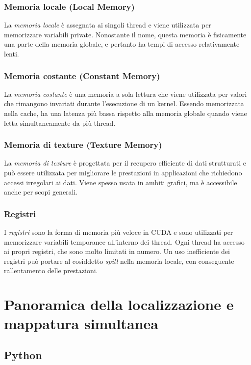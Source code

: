 \documentclass[12pt,a4paper]{report}
\begin{document}
\subsection{Memoria locale (Local Memory)}
La \textit{memoria locale} è assegnata ai singoli thread e viene utilizzata per memorizzare variabili private. Nonostante il nome, questa memoria è fisicamente una parte della memoria globale, e pertanto ha tempi di accesso relativamente lenti.

\subsection{Memoria costante (Constant Memory)}
La \textit{memoria costante} è una memoria a sola lettura che viene utilizzata per valori che rimangono invariati durante l'esecuzione di un kernel. Essendo memorizzata nella cache, ha una latenza più bassa rispetto alla memoria globale quando viene letta simultaneamente da più thread.

\subsection{Memoria di texture (Texture Memory)}
La \textit{memoria di texture} è progettata per il recupero efficiente di dati strutturati e può essere utilizzata per migliorare le prestazioni in applicazioni che richiedono accessi irregolari ai dati. Viene spesso usata in ambiti grafici, ma è accessibile anche per scopi generali.

\subsection{Registri}
I \textit{registri} sono la forma di memoria più veloce in CUDA e sono utilizzati per memorizzare variabili temporanee all'interno dei thread. Ogni thread ha accesso ai propri registri, che sono molto limitati in numero. Un uso inefficiente dei registri può portare al cosiddetto \textit{spill} nella memoria locale, con conseguente rallentamento delle prestazioni.







\chapter{Panoramica della localizzazione e mappatura simultanea }

\section{Python}
\end{document}
